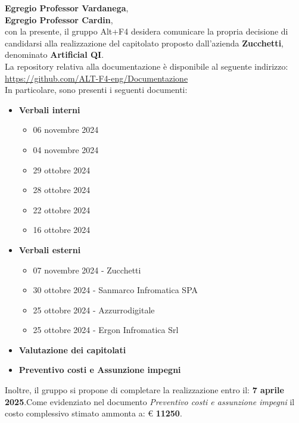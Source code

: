 \documentclass[a4paper, 12pt]{article}
\begin{document}
\primapagina


\newpage

\textbf{Egregio Professor Vardanega},\\
\textbf{Egregio Professor Cardin}, \\
con la presente, il gruppo Alt+F4 desidera comunicare la propria decisione di candidarsi alla realizzazione del capitolato proposto dall’azienda \textbf{Zucchetti}, denominato \textbf{Artificial QI}.\\

La repository relativa alla documentazione è disponibile al seguente indirizzo:\\

\href{https://github.com/ALT-F4-eng/Documentazione}{https://github.com/ALT-F4-eng/Documentazione}\\

In particolare, sono presenti i seguenti documenti:
\begin{itemize}
    \item \textbf{Verbali interni}
    \begin{itemize} %
        \item 06 novembre 2024
        \item 04 novembre 2024
        \item 29 ottobre 2024
        \item 28 ottobre 2024
        \item 22 ottobre 2024
        \item 16 ottobre 2024
    \end{itemize}
    \item \textbf{Verbali esterni}
    \begin{itemize} 
        \item 07 novembre 2024 - Zucchetti
        \item 30 ottobre 2024 - Sanmarco Infromatica SPA
        \item 25 ottobre 2024 - Azzurrodigitale
        \item 25 ottobre 2024 - Ergon Infromatica Srl
    \end{itemize}
    \item \textbf{Valutazione dei capitolati}
    \item \textbf{Preventivo costi e Assunzione impegni}
\end{itemize}
Inoltre, il gruppo si propone di completare la realizzazione entro il:
\textbf{7 aprile 2025}.Come evidenziato nel documento \textit{Preventivo costi e assunzione impegni} il costo complessivo stimato ammonta a: € \textbf{11250}.\\
\end{document}
